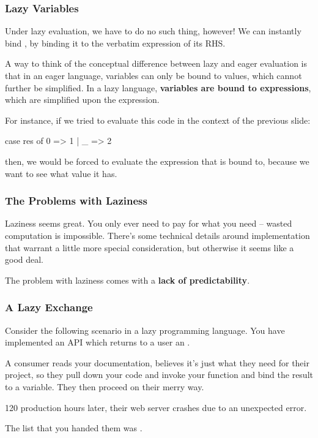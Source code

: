 \documentclass[aspectratio=169]{beamer}
\begin{document}
\begin{frame}[fragile]
  \frametitle{Lazy Variables}

  Under lazy evaluation, we have to do no such thing, however! We can instantly
  bind , by binding it to the verbatim expression of its RHS.

  \pause
  \vspace{\fill}

  A way to think of the conceptual difference between lazy and eager evaluation
  is that in an eager language, variables can only be bound to values, which
  cannot further be simplified. In a lazy language, \textbf{variables are bound to
  expressions}, which are simplified upon  the expression.

  \pause
  \vspace{\fill}

  For instance, if we tried to evaluate this code in the context of the previous
  slide:
  \begin{codeblock}
    case res of
      0 => 1
    | _ => 2
  \end{codeblock}
  then, we would be forced to evaluate the expression that  is bound
  to, because we want to see what value it has.
\end{frame}

\begin{frame}[fragile]
  \frametitle{The Problems with Laziness}

  Laziness seems great. You only ever need to pay for what you need --
  wasted computation is impossible. There's some technical details around
  implementation that warrant a little more special consideration, but otherwise
  it seems like a good deal.

  \pause
  \vspace{\fill}

  The problem with laziness comes with a \textbf{lack of predictability}.
\end{frame}

\begin{frame}[fragile]
  \frametitle{A Lazy Exchange}

  Consider the following scenario in a lazy programming language. You have
  implemented an API which returns to a user an .

  \pause
  \vspace{\fill}

  A consumer reads your documentation, believes it's just what they need for
  their project, so they pull down your code and invoke your function and
  bind the result to a variable. They then proceed on their merry way.

  \pause
  \vspace{\fill}

  120 production hours later, their web server crashes due to an unexpected
  error.

  \pause
  \vspace{\fill}

  The list that you handed them was .
\end{frame}
\end{document}
